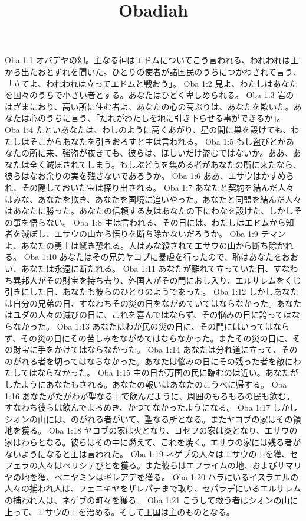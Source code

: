 

\title{Obadiah}

Oba 1:1  オバデヤの幻。主なる神はエドムについてこう言われる、われわれは主から出たおとずれを聞いた。ひとりの使者が諸国民のうちにつかわされて言う、「立てよ、われわれは立ってエドムと戦おう」。
Oba 1:2  見よ、わたしはあなたを国々のうちで小さい者とする。あなたはひどく卑しめられる。
Oba 1:3  岩のはざまにおり、高い所に住む者よ、あなたの心の高ぶりは、あなたを欺いた。あなたは心のうちに言う、「だれがわたしを地に引き下らせる事ができるか」。
Oba 1:4  たといあなたは、わしのように高くあがり、星の間に巣を設けても、わたしはそこからあなたを引きおろすと主は言われる。
Oba 1:5  もし盗びとがあなたの所に来、強盗が夜きても、彼らは、ほしいだけ盗むではないか。ああ、あなたは全く滅ぼされてしまう。もしぶどうを集める者があなたの所に来たなら、彼らはなお余りの実を残さないであろうか。
Oba 1:6  ああ、エサウはかすめられ、その隠しておいた宝は探り出される。
Oba 1:7  あなたと契約を結んだ人々はみな、あなたを欺き、あなたを国境に追いやった。あなたと同盟を結んだ人々はあなたに勝った。あなたの信頼する友はあなたの下にわなを設けた、しかしその事を悟らない。
Oba 1:8  主は言われる、その日には、わたしはエドムから知者を滅ぼし、エサウの山から悟りを断ち除かないだろうか。
Oba 1:9  テマンよ、あなたの勇士は驚き恐れる。人はみな殺されてエサウの山から断ち除かれる。
Oba 1:10  あなたはその兄弟ヤコブに暴虐を行ったので、恥はあなたをおおい、あなたは永遠に断たれる。
Oba 1:11  あなたが離れて立っていた日、すなわち異邦人がその財宝を持ち去り、外国人がその門におし入り、エルサレムをくじ引きにした日、あなたも彼らのひとりのようであった。
Oba 1:12  しかしあなたは自分の兄弟の日、すなわちその災の日をながめていてはならなかった。あなたはユダの人々の滅びの日に、これを喜んではならず、その悩みの日に誇ってはならなかった。
Oba 1:13  あなたはわが民の災の日に、その門にはいってはならず、その災の日にその苦しみをながめてはならなかった。またその災の日に、その財宝に手をかけてはならなかった。
Oba 1:14  あなたは分れ道に立って、そののがれる者を切ってはならなかった。あなたは悩みの日にその残った者を敵にわたしてはならなかった。
Oba 1:15  主の日が万国の民に臨むのは近い。あなたがしたようにあなたもされる。あなたの報いはあなたのこうべに帰する。
Oba 1:16  あなたがたがわが聖なる山で飲んだように、周囲のもろもろの民も飲む。すなわち彼らは飲んでよろめき、かつてなかったようになる。
Oba 1:17  しかしシオンの山には、のがれる者がいて、聖なる所となる。またヤコブの家はその領地を獲る。
Oba 1:18  ヤコブの家は火となり、ヨセフの家は炎となり、エサウの家はわらとなる。彼らはその中に燃えて、これを焼く。エサウの家には残る者がないようになると主は言われた。
Oba 1:19  ネゲブの人々はエサウの山を獲、セフェラの人々はペリシテびとを獲る。また彼らはエフライムの地、およびサマリヤの地を獲、ベニヤミンはギレアデを獲る。
Oba 1:20  ハラにいるイスラエルの人々の捕われ人は、フェニキヤをザレパテまで取り、セパラデにいるエルサレムの捕われ人は、ネゲブの町々を獲る。
Oba 1:21  こうして救う者はシオンの山に上って、エサウの山を治める。そして王国は主のものとなる。


